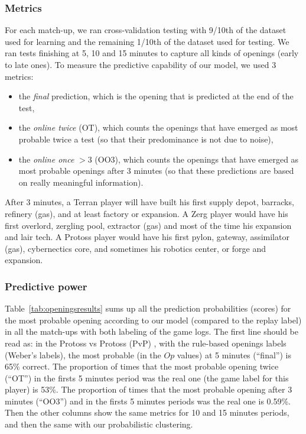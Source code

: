 \subsubsection{Metrics}
For each match-up, we ran cross-validation testing with 9/10th of the dataset used for learning and the remaining 1/10th of the dataset used for testing. We ran tests finishing at 5, 10 and 15 minutes to capture all kinds of openings (early to late ones). To measure the predictive capability of our model, we used 3 metrics: 
\begin{itemize}
\item the \textit{final} prediction, which is the opening that is predicted at the end of the test, 
\item the \textit{online twice} (OT), which counts the openings that have emerged as most probable twice a test (so that their predominance is not due to noise),
\item the \textit{online once} $> 3$ (OO3), which counts the openings that have emerged as most probable openings after 3 minutes (so that these predictions are based on really meaningful information).
\end{itemize}
After 3 minutes, a Terran player will have built his first supply depot, barracks, refinery (gas), and at least factory or expansion. A Zerg player would have his first overlord, zergling pool, extractor (gas) and most of the time his expansion and lair tech. A Protoss player would have his first pylon, gateway, assimilator (gas), cybernectics core, and sometimes his robotics center, or forge and expansion.


\subsubsection{Predictive power}
Table~\ref{tab:openingsresults} sums up all the prediction probabilities (scores) for the most probable opening according to our model (compared to the replay label) in all the match-ups with both labeling of the game logs. The first line should be read as: in the Protoss vs Protoss (PvP) , with the rule-based openings labels (Weber's labels), the most probable  (in the $Op$ values) at 5 minutes (``final'') is 65\% correct. The proportion of times that the most probable opening twice (``OT'') in the firsts 5 minutes period was the real one (the game label for this player) is 53\%. The proportion of times that the most probable opening after 3 minutes (``OO3'') and in the firsts 5 minutes periods was the real one is 0.59\%. Then the other columns show the same metrics for 10 and 15 minutes periods, and then the same with our probabilistic clustering.

